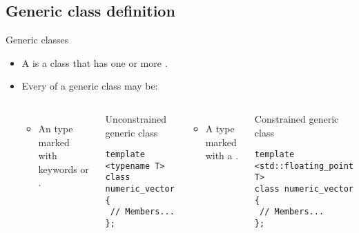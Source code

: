 \subsection{Generic class definition}

\begin{frame}[t,fragile]{Generic classes}
\begin{itemize}
  \item A  is a class that has one or more
        .

  \item Every  of a generic class may be:

\begin{columns}[T]

\pause
{}
    \begin{itemize}
      \item An  type marked with keywords  or .
    \end{itemize}

\begin{block}{Unconstrained generic class}
\begin{lstlisting}
template <typename T>
class numeric_vector {
 // Members...
};
\end{lstlisting}
\end{block}

\pause
{}
    \begin{itemize}
      \item A  type marked with a .
    \end{itemize}
\begin{block}{Constrained generic class}
\begin{lstlisting}
template <std::floating_point T>
class numeric_vector {
 // Members...
};
\end{lstlisting}
\end{block}

\end{columns}

\end{itemize}
\end{frame}



